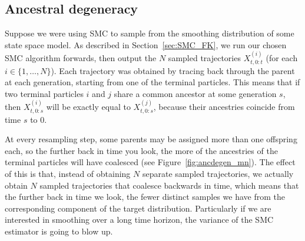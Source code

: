 \subsection{Ancestral degeneracy}
Suppose we were using SMC to sample from the smoothing distribution of some state space model.
As described in Section~\ref{sec:SMC_FK}, we run our chosen SMC algorithm forwards, then output the $N$ sampled trajectories $X_{t,0:t}^{(i)}$ (for each $i\in\{1,\dots,N\}$).
Each trajectory was obtained by tracing back through the parent at each generation, starting from one of the terminal particles. 
This means that if two terminal particles $i$ and $j$ share a common ancestor at some generation $s$, then $X_{t,0:s}^{(i)}$ will be exactly equal to $X_{t,0:s}^{(j)}$, because their ancestries coincide from time $s$ to $0$.

At every resampling step, some parents may be assigned more than one offspring each, so the further back in time you look, the more of the ancestries of the terminal particles will have coalesced (see Figure~\ref{fig:ancdegen_mn}).
The effect of this is that, instead of obtaining $N$ separate sampled trajectories, we actually obtain $N$ sampled trajectories that coalesce backwards in time, which means that the further back in time we look, the fewer distinct samples we have from the corresponding component of the target distribution.
Particularly if we are interested in smoothing over a long time horizon, the variance of the SMC estimator is going to blow up.

